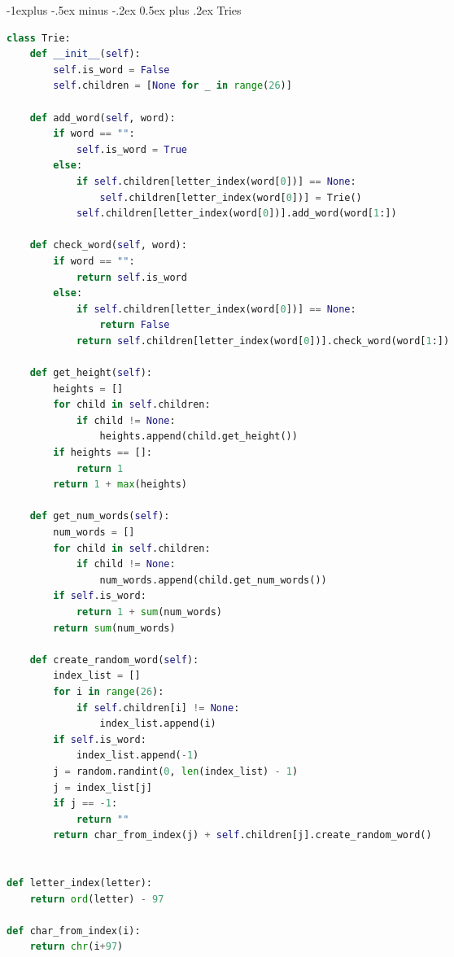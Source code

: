 \documentclass[letterpaper, 8pt]{extarticle}
\makeatletter
\renewcommand{\subsection}{\@startsection{subsection}{2}{0mm}%
                                {-1explus -.5ex minus -.2ex}%
                                {0.5ex plus .2ex}%
                                {\normalfont\small\bfseries}}
\makeatother
\begin{document}
\begin{multicols*}{5}
\subsection{Tries}
\begin{lstlisting}[language=Python]
class Trie:
    def __init__(self):
        self.is_word = False
        self.children = [None for _ in range(26)]

    def add_word(self, word):
        if word == "":
            self.is_word = True
        else:
            if self.children[letter_index(word[0])] == None:
                self.children[letter_index(word[0])] = Trie()
            self.children[letter_index(word[0])].add_word(word[1:])

    def check_word(self, word):
        if word == "":
            return self.is_word
        else:
            if self.children[letter_index(word[0])] == None:
                return False
            return self.children[letter_index(word[0])].check_word(word[1:])

    def get_height(self):
        heights = []
        for child in self.children:
            if child != None:
                heights.append(child.get_height())
        if heights == []:
            return 1
        return 1 + max(heights)

    def get_num_words(self):
        num_words = []
        for child in self.children:
            if child != None:
                num_words.append(child.get_num_words())
        if self.is_word:
            return 1 + sum(num_words)
        return sum(num_words)

    def create_random_word(self):
        index_list = []
        for i in range(26):
            if self.children[i] != None:
                index_list.append(i)
        if self.is_word:
            index_list.append(-1)
        j = random.randint(0, len(index_list) - 1)
        j = index_list[j]
        if j == -1:
            return ""
        return char_from_index(j) + self.children[j].create_random_word()


def letter_index(letter):
    return ord(letter) - 97

def char_from_index(i):
    return chr(i+97)
\end{lstlisting}


\end{multicols*}
\end{document}
